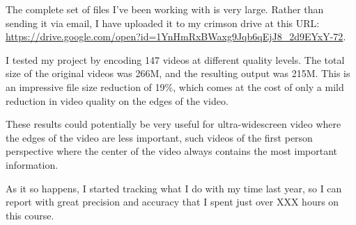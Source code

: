 \documentclass[11pt,oneside,letterpaper]{article}
\begin{document}
The complete set of files I've been working with is very large. Rather than
sending it via email, I have uploaded it to my crimson drive at this URL:
\url{https://drive.google.com/open?id=1YnHmRxBWaxg9Jqb6qEjJ8_2d9EYxY-72}.

I tested my project by encoding 147 videos at different quality levels. The
total size of the original videos was 266M, and the resulting output was
215M. This is an impressive file size reduction of 19\%, which comes at the cost
of only a mild reduction in video quality on the edges of the video.

These results could potentially be very useful for ultra-widescreen video where
the edges of the video are less important, such videos of the first person
perspective where the center of the video always contains the most important
information.

As it so happens, I started tracking what I do with my time last year, so I can
report with great precision and accuracy that I spent just over XXX hours on
this course.
\end{document}

